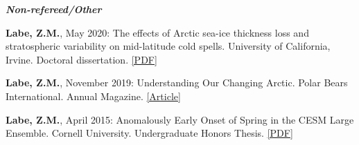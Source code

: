 \documentclass[margin,line,palatino,courier,10pt]{res}
\begin{document}
\begin{resume}
\textit{\textbf{Non-refereed/Other}}
\vspace*{-0.1in}\\
\begin{etaremune}[leftmargin=0in,topsep=0in,parsep=0in]
\item \textbf{Labe, Z.M.}, May 2020: The effects of Arctic sea-ice thickness loss and stratospheric variability on mid-latitude cold spells. University of California, Irvine. Doctoral dissertation. \href{https://escholarship.org/uc/item/778982rr}{[PDF]}
\item \textbf{Labe, Z.M.}, November 2019: Understanding Our Changing Arctic. Polar Bears International. Annual Magazine. \href{https://polarbearsinternational.org/media/3480/pbi_2019_newsmag_web.pdf}{[Article]}
\item \textbf{Labe, Z.M.}, April 2015: Anomalously Early Onset of Spring in the CESM Large Ensemble. Cornell University. Undergraduate Honors Thesis. \href{http://sites.uci.edu/zlabe/files/2015/11/Labe_Thesis2015.pdf}{[PDF]}
\end{etaremune}

\vspace{-0.1in}
\noindent\textcolor{Cerulean}{\makebox[\linewidth][r]{\rule{\textwidth}{5pt}}}
\vspace{-0.3in} 


\end{resume}
\end{document}

